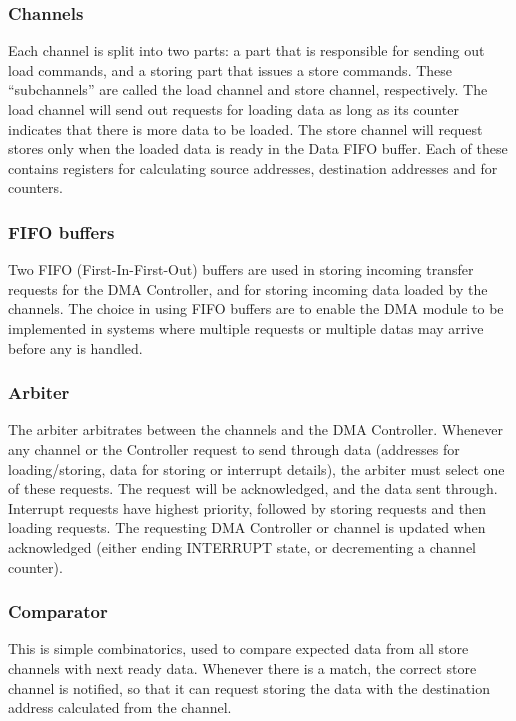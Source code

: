 \subsubsection{Channels}
Each channel is split into two parts: a part that is responsible for sending out load
commands, and a storing part that issues a store commands. These ``subchannels''
are called the load channel and store channel, respectively.
The load channel will send out requests for loading data as long as its counter indicates that there is more data to be loaded. The store channel will request stores only when the loaded data is ready in the Data FIFO buffer.
Each of these contains registers for calculating source addresses, destination addresses and for counters.

\subsubsection{FIFO buffers}
Two FIFO (First-In-First-Out) buffers are used in storing incoming transfer requests for the DMA Controller, and for storing incoming data loaded by the channels.
The choice in using FIFO buffers are to enable the DMA module to be implemented in systems where multiple requests or multiple datas may arrive before any is handled.

\subsubsection{Arbiter}
The arbiter arbitrates between the channels and the DMA Controller.
Whenever any channel or the Controller request to send through data (addresses for loading/storing, data for storing or interrupt details), the arbiter must select one of these requests.
The request will be acknowledged, and the data sent through.
Interrupt requests have highest priority, followed by storing requests and then loading requests.
The requesting DMA Controller or channel is updated when acknowledged (either ending INTERRUPT state, or decrementing a channel counter).

\subsubsection{Comparator}
This is simple combinatorics, used to compare expected data from all store channels with next ready data.
Whenever there is a match, the correct store channel is notified, so that it can request storing the data with the destination address calculated from the channel.


